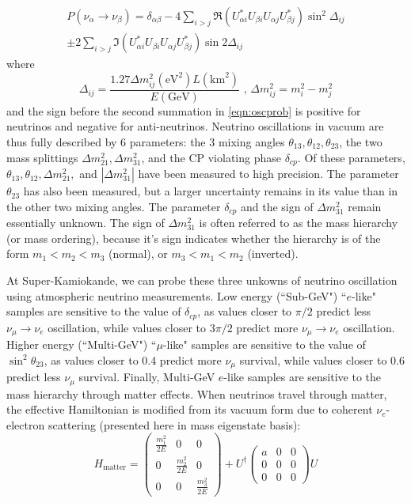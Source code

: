 \documentclass[12pt,oneside,openright]{article}
\begin{document}
\begin{multline}
P(\nu_{\alpha} \rightarrow \nu_{\beta})= \delta_{\alpha\beta}-4\sum_{i>j} \Re(U_{\alpha i}^*U_{\beta i}U_{\alpha j}U_{\beta j}^*)\sin^2 \Delta_{ij} \\ \pm 2\sum_{i>j} \Im(U_{\alpha i}^*U_{\beta i}U_{\alpha j}U_{\beta j}^*)\sin 2\Delta_{ij}
\label{eqn:oscprob}
\end{multline}
where 
\begin{equation}
 \Delta_{ij}=\frac{1.27 \Delta m_{ij}^2 (\textrm{eV}^2) L(\textrm{km}^2)}{E (\textrm{GeV})} \textrm{ , }
\Delta  m_{ij}^2=m_i^2-m_j^2
\end{equation}
 and the sign before the second summation in \cref{eqn:oscprob} is positive for neutrinos and negative for anti-neutrinos.
Neutrino oscillations in vacuum are thus fully described by 6 parameters: the 3 mixing angles $\theta_{13}, \theta_{12}, \theta_{23}$, the two mass splittings $\Delta m_{21}^2, \Delta m_{31}^2$, and the CP violating phase $\delta_{cp}$.  Of these parameters, $\theta_{13}, \theta_{12}, \Delta m_{21}^2,$ and $|\Delta m_{31}^2|$ have been measured to high precision.  The parameter $\theta_{23}$ has also been measured, but a larger uncertainty remains in its value than in the other two mixing angles.  The parameter $\delta_{cp}$ and the sign of $\Delta m_{31}^2$ remain essentially unknown.  The sign of $\Delta m_{31}^2$ is often referred to as the mass hierarchy (or mass ordering), because it's sign indicates whether the hierarchy is of the form $m_1<m_2<m_3$ (normal), or $m_3<m_1<m_2$ (inverted).\par
At Super-Kamiokande, we can probe these three unkowns of neutrino oscillation using atmospheric neutrino measurements.   Low energy (``Sub-GeV") ``$e$-like" samples are sensitive to the value of $\delta_{cp}$, as values closer to $\pi/2$ predict less $\nu_\mu \rightarrow \nu_e$ oscillation, while values closer to $3\pi/2$ predict more $\nu_\mu \rightarrow \nu_e$ oscillation.  Higher energy (``Multi-GeV") ``$\mu$-like" samples are sensitive to the value of $\sin^2 \theta_{23}$, as values closer to 0.4 predict more $\nu_\mu$ survival, while values closer to 0.6 predict less $\nu_\mu$ survival.  Finally, Multi-GeV $e$-like samples are sensitive to the mass hierarchy through matter effects.  When neutrinos travel through matter, the effective Hamiltonian is modified from its vacuum form due to coherent $\nu_e$-electron scattering (presented here in mass eigenstate basis):
\begin{equation}
H_{\textrm{matter}}=\begin{pmatrix}\frac{m_1^2}{2E}&0&0\\0&\frac{m_2^2}{2E}&0\\0&0&\frac{m_3^2}{2E} \end{pmatrix}  + U^\dagger\begin{pmatrix}a&0&0\\0&0&0\\0&0&0\end{pmatrix}U
\label{eqn:hamiltonian_matter}
\end{equation}
\end{document}
